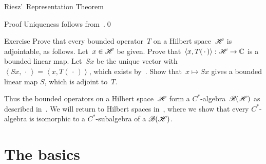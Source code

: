 \documentclass[a]{subfiles}
\begin{document}
\begin{parsec}
\begin{point}{Riesz'~Representation Theorem}
\begin{point}{Proof}
Uniqueness follows from~.\qed
\end{point}
\end{point}
\begin{point}{Exercise}%
Prove that every bounded operator~$T$ on a Hilbert space~$\mathscr{H}$
is adjointable, as follows.
Let~$x\in \mathscr{H}$ be given.
Prove that~$\left<x,T(\,\cdot\,)\right>\colon \mathscr{H}\to \mathbb{C}$
is a bounded linear map.
Let~$Sx$ be the unique vector with $\left<Sx,\,\cdot\,\right>
=\left<x,T(\,\cdot\,)\right>$,
which exists by~.
Show that~$x\mapsto Sx$
gives a bounded linear map $S$, which is adjoint to~$T$.
\end{point}
\begin{point}%
Thus the bounded operators
on a Hilbert space~$\mathscr{H}$
form a $C^*$-algebra~$\mathscr{B}(\mathscr{H})$
as described in~.
We will return to Hilbert spaces
in~,
where we show that every $C^*$-algebra
is isomorphic to a $C^*$-subalgebra of
a $\mathscr{B}(\mathscr{H})$.
\end{point}
\end{parsec}

\section{The basics}
\end{document}
